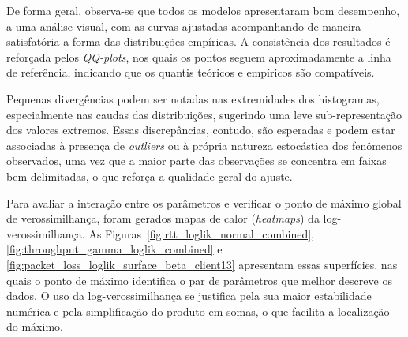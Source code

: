 \documentclass{article}
\begin{document}
De forma geral, observa-se que todos os modelos apresentaram bom desempenho, a uma análise visual,
com as curvas ajustadas acompanhando de maneira satisfatória a forma das distribuições empíricas.
A consistência dos resultados é reforçada pelos \textit{QQ-plots}, nos quais os pontos seguem
aproximadamente a linha de referência, indicando que os quantis teóricos e empíricos são compatíveis.

Pequenas divergências podem ser notadas nas extremidades dos histogramas, especialmente nas caudas
das distribuições, sugerindo uma leve sub-representação dos valores extremos.
Essas discrepâncias, contudo, são esperadas e podem estar associadas à presença de \textit{outliers}
ou à própria natureza estocástica dos fenômenos observados, uma vez que a maior parte das observações
se concentra em faixas bem delimitadas, o que reforça a qualidade geral do ajuste.

Para avaliar a interação entre os parâmetros e verificar o ponto de máximo global de verossimilhança,
foram gerados mapas de calor (\textit{heatmaps}) da log-verossimilhança.
As Figuras~\ref{fig:rtt_loglik_normal_combined}, \ref{fig:throughput_gamma_loglik_combined}
e \ref{fig:packet_loss_loglik_surface_beta_client13} apresentam essas superfícies,
nas quais o ponto de máximo identifica o par de parâmetros que melhor descreve os dados.
O uso da log-verossimilhança se justifica pela sua maior estabilidade numérica
e pela simplificação do produto em somas, o que facilita a localização do máximo.
\end{document}
